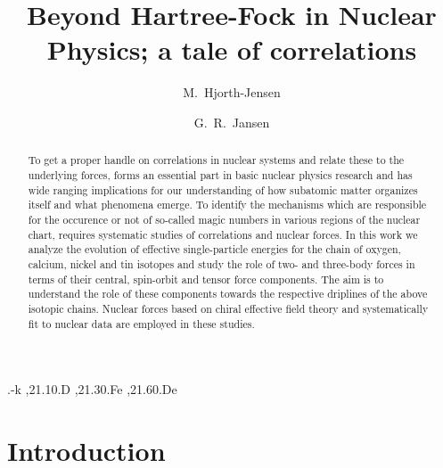 \documentclass[preprint,12pt,authoryear]{elsarticle}
\begin{document}
\begin{frontmatter}
\title{Beyond Hartree-Fock in Nuclear Physics; a tale of correlations}
\author{M.~Hjorth-Jensen}
\address{National Superconducting Cyclotron Laboratory and Department of Physics and Astronomy, Michigan
  State University, East Lansing, MI 48824-1321, USA}
\address{Department of Physics, University of Oslo, N-0316 Oslo, Norway}
\author{G.~R.~Jansen}
\address{National Center for Computational Sciences and Physics Division,, Oak Ridge National Laboratory,
Oak Ridge, TN 37831, USA}

\begin{abstract}
To get a proper handle on correlations in nuclear systems and relate
these to the underlying forces, forms an essential part in basic
nuclear physics research and has wide ranging implications for our
understanding of how subatomic matter organizes itself and what
phenomena emerge. To identify the mechanisms which are
responsible for the occurence or not of so-called magic numbers in
various regions of the nuclear chart, requires systematic studies of
correlations and nuclear forces.
In this work we analyze the evolution of effective
   single-particle energies for the chain of oxygen, calcium, nickel
   and tin isotopes and study the role of two- and three-body forces
   in terms of their central, spin-orbit and tensor force components.
   The aim is to understand the role of these components towards the
   respective driplines of the above isotopic chains. Nuclear forces
   based on chiral effective field theory and systematically fit to
   nuclear data are employed in these studies.

\end{abstract}

\begin{keyword}
.-k \sep 21.10.D \sep 21.30.Fe \sep 21.60.De

\end{keyword}

\end{frontmatter}



\section{Introduction}\label{sec:intro}
\end{document}
